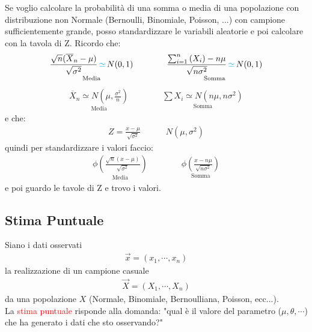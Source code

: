 \documentclass{article}  %
\theoremstyle{definition}
\begin{document}
\begin{osservazioni}
	Se voglio calcolare la probabilità di una somma o media di una popolazione con distribuzione non Normale (Bernoulli, Binomiale, Poisson, ...) con campione sufficientemente grande,
	posso standardizzare le variabili aleatorie
	e poi calcolare con la tavola di Z. Ricordo che:
	\begin{align*}
		\underset{\text{Media}}{\frac{\sqrt{n}(\overline{X}_n - \mu)}{\sqrt{\sigma^2}} \, \textcolor{cyan}{\simeq} \, N(0,1)}
		\quad \quad \quad \quad
		\underset{\text{Somma}}{\frac{\sum^{n}_{i=1} \left(X_i\right) - n \mu}{\sqrt{n\sigma^2}} \, \textcolor{cyan}{\simeq} \, N(0,1)}
	\end{align*}
	\begin{align*}
		\underset{\text{Media}}{\overline{X}_n \simeq N\left(\mu, \frac{\sigma^2}{n}\right)}
		\quad \quad \quad \quad
		\underset{\text{Somma}}{\sum X_i \simeq N\left(n\mu, n\sigma^2\right)}
	\end{align*}
	e che:
	\begin{align*}
		Z = \frac{x-\mu}{\sqrt{\sigma^2}} \quad \quad \quad N(\mu, \sigma^2)
	\end{align*}
	quindi per standardizzare i valori faccio:
	\begin{align*}
		\underset{\text{Media}}{\phi\left(\frac{\sqrt{n}(x - \mu)}{\sqrt{\sigma^2}}\right)}
		\quad \quad \quad \quad
		\underset{\text{Somma}}{\phi\left(\frac{x - n \mu}{\sqrt{n\sigma^2}}\right)}
	\end{align*}
	e poi guardo le tavole di Z e trovo i valori.
\end{osservazioni}
\subsection{Stima Puntuale}
Siano i dati osservati
\begin{align*}
	\vec{x} = (x_1, \cdots, x_n)
\end{align*}
la realizzazione di un campione casuale
\begin{align*}
	\vec{X} = \left(X_1, \cdots, X_n \right)
\end{align*}
da una popolazione $X$ (Normale, Binomiale, Bernoulliana, Poisson, ecc...). \\
La \textcolor{red}{stima puntuale} risponde alla domanda: "qual è il valore del parametro ($\mu, \theta, \cdots$) che ha generato i dati che sto osservando?"
\end{document}
